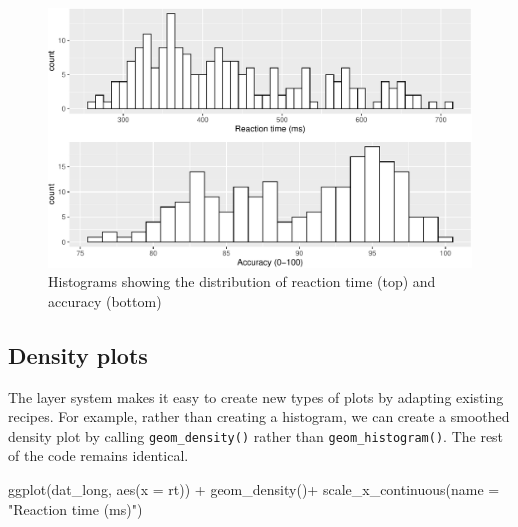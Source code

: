 \documentclass[
  english,
  doc,floatsintext]{apa6}
\newenvironment{Shaded}{\begin{snugshade}}{\end{snugshade}}
\newcommand{\AttributeTok}[1]{\textcolor[rgb]{0.77,0.63,0.00}{#1}}
\newcommand{\FunctionTok}[1]{\textcolor[rgb]{0.00,0.00,0.00}{#1}}
\newcommand{\NormalTok}[1]{#1}
\newcommand{\SpecialCharTok}[1]{\textcolor[rgb]{0.00,0.00,0.00}{#1}}
\newcommand{\StringTok}[1]{\textcolor[rgb]{0.31,0.60,0.02}{#1}}
\begin{document}
\begin{figure}

{\centering \includegraphics[width=1\linewidth]{images/histograms-1} 

}

\caption{Histograms showing the distribution of reaction time (top) and accuracy (bottom)}\label{fig:histograms}
\end{figure}

\hypertarget{density-plots}{%
\subsection{Density plots}\label{density-plots}}

The layer system makes it easy to create new types of plots by adapting existing recipes. For example, rather than creating a histogram, we can create a smoothed density plot by calling \texttt{geom\_density()} rather than \texttt{geom\_histogram()}. The rest of the code remains identical.

\begin{Shaded}
\begin{Highlighting}[]
\FunctionTok{ggplot}\NormalTok{(dat\_long, }\FunctionTok{aes}\NormalTok{(}\AttributeTok{x =}\NormalTok{ rt)) }\SpecialCharTok{+}
  \FunctionTok{geom\_density}\NormalTok{()}\SpecialCharTok{+}
  \FunctionTok{scale\_x\_continuous}\NormalTok{(}\AttributeTok{name =} \StringTok{"Reaction time (ms)"}\NormalTok{)}
\end{Highlighting}
\end{Shaded}
\end{document}
